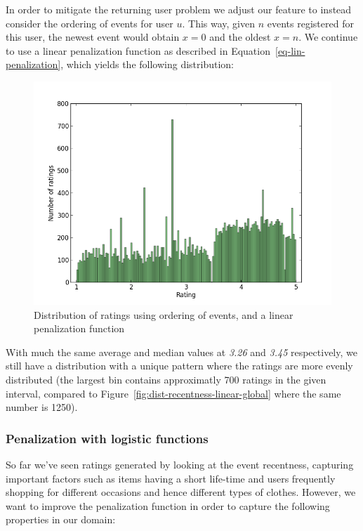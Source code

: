 In order to mitigate the returning user problem we adjust our feature to
instead consider the ordering of events for user $u$. This way, given $n$
events registered for this user, the newest event would obtain $x=0$ and the
oldest $x=n$. We continue to use a linear penalization function as described in
Equation~\ref{eq-lin-penalization}, which yields the following distribution:

\begin{figure}[H]
  \centering
  \includegraphics[scale=0.6]{image/dist-count-linear}
  \caption{Distribution of ratings using ordering of events, and a linear
 penalization function}
  \label{fig:dist-count-linear}
\end{figure}

With much the same average and median values at \textit{3.26} and \textit{3.45}
respectively, we still have a distribution with a unique pattern where the
ratings are more evenly distributed (the largest bin contains approximatly 700
ratings in the given interval, compared to
Figure~\ref{fig:dist-recentness-linear-global} where the same number is 1250).

\subsubsection{Penalization with logistic functions}

So far we've seen ratings generated by looking at the event recentness,
capturing important factors such as items having a short life-time and users
frequently shopping for different occasions and hence different types of
clothes. However, we want to improve the penalization function in order to
capture the following properties in our domain:

